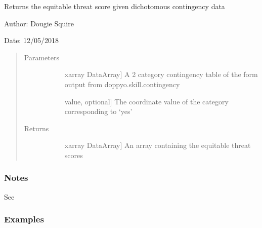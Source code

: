 \documentclass[letterpaper,10pt,english]{sphinxmanual}
\begin{document}

\begin{fulllineitems}
\label{\detokenize{skill_doc:skill.equit_threat_score}}
Returns the equitable threat score given dichotomous contingency data

\begin{DUlineblock}{0em}
\item[] Author: Dougie Squire
\item[] Date: 12/05/2018
\end{DUlineblock}
\begin{quote}\begin{description}
\item[{Parameters}] \leavevmode\begin{description}
\item[{}] \leavevmode{[}xarray DataArray{]}
A 2 category contingency table of the form output from doppyo.skill.contingency

\item[{}] \leavevmode{[}value, optional{]}
The coordinate value of the category corresponding to ‘yes’

\end{description}

\item[{Returns}] \leavevmode\begin{description}
\item[{}] \leavevmode{[}xarray DataArray{]}
An array containing the equitable threat scores

\end{description}

\end{description}\end{quote}
\subsubsection*{Notes}

See 
\subsubsection*{Examples}


\end{fulllineitems}
\end{document}
